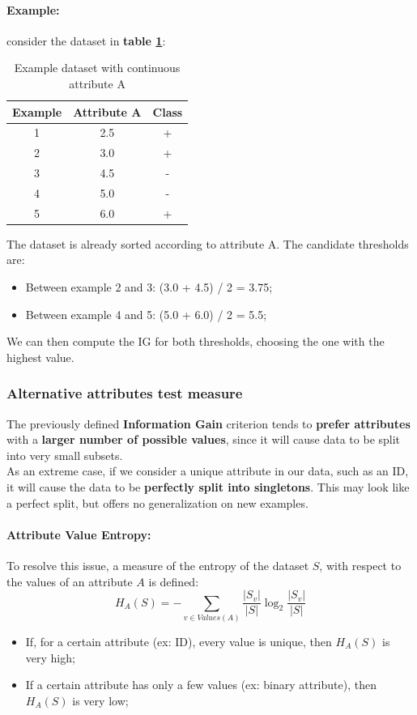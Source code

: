 \paragraph{Example:} consider the dataset in \textbf{table \ref{tab:continuous-attribute}}:
\begin{table}[H]
    \centering
    \begin{tabular}{|c|c|c|}
        \hline
        Example & Attribute A & Class \\
        \hline
        1 & 2.5 & + \\
        2 & 3.0 & + \\
        3 & 4.5 & - \\
        4 & 5.0 & - \\
        5 & 6.0 & + \\
        \hline
    \end{tabular}
    \caption{Example dataset with continuous attribute A}
    \label{tab:continuous-attribute}
\end{table}
The dataset is already sorted according to attribute A. The candidate thresholds are:
\begin{itemize}
    \item Between example 2 and 3: (3.0 + 4.5) / 2 = 3.75;
    \item Between example 4 and 5: (5.0 + 6.0) / 2 = 5.5;
\end{itemize}
We can then compute the IG for both thresholds, choosing the one with the highest value.

\subsubsection{Alternative attributes test measure}
The previously defined \textbf{Information Gain} criterion tends to \textbf{prefer attributes} with a 
\textbf{larger number of possible values}, since it will cause data to be split into very small subsets.
\\As an extreme case, if we consider a unique attribute in our data, such as an ID, it will cause the data to be 
\textbf{perfectly split into singletons}. This may look like a perfect split, but offers no generalization on new examples.

\paragraph{Attribute Value Entropy:} 
To resolve this issue, a measure of the entropy of the dataset $S$, with respect to the values of an attribute $A$ is defined:
\begin{equation}
    H_A(S) = - \sum_{v\in Values(A)} \frac{|S_v|}{|S|} \log_2 \frac{|S_v|}{|S|}
\end{equation}
\begin{itemize}
    \item If, for a certain attribute (ex: ID), every value is unique, then $H_A(S)$ is very high;
    \item If a certain attribute has only a few values (ex: binary attribute), then $H_A(S)$ is very low;
\end{itemize}
